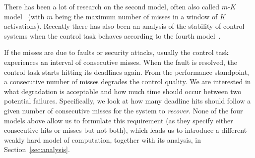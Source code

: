 There has been a lot of research on the second model, often also called $m$-$K$ model~\cite{Koren:1995, Ramanathan:1997, Soudbakhsh:2013, Bund:2014, Frehse:2014, Bund:2015, Hammadeh:2017a, Hammadeh:2017b, Sun:2017, Ahrendts:2018, Soudbakhsh:2018, Pazzaglia:2018, Pazzaglia:2019, Gaukler:2019a} (with $m$ being the maximum number of misses in a window of $K$ activations).
Recently there has also been an analysis of the stability of control systems when the control task behaves according to the fourth model~\cite{Maggio:2020}.

If the misses are due to faults or security attacks, usually the control task experiences an interval of consecutive misses.
When the fault is resolved, the control task starts hitting its deadlines again.
From the performance standpoint, a consecutive number of misses degrades the control quality.
We are interested in what degradation is acceptable and how much time should occur between two potential failures.
Specifically, we look at how many deadline hits should follow a given number of consecutive misses for the system to \emph{recover}.
None of the four models above allow us to formulate this requirement (as they specify either consecutive hits or misses but not both), which leads us to introduce a different weakly hard model of computation, together with its analysis, in Section~\ref{sec:analysis}.
